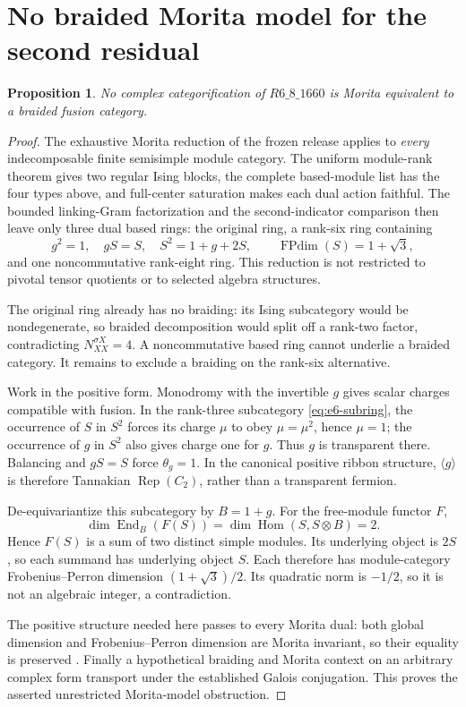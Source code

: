 \documentclass[10pt]{article}
\newtheorem{proposition}[theorem]{Proposition}
\newcommand{\FPdim}{\operatorname{FPdim}}
\begin{document}
\section{No braided Morita model for the second residual}
\begin{proposition}
No complex categorification of $R6\_8\_1660$ is Morita equivalent to a braided fusion category.
\end{proposition}
\begin{proof}
The exhaustive Morita reduction of the frozen release applies to \emph{every} indecomposable finite semisimple module category. The uniform module-rank theorem gives two regular Ising blocks, the complete based-module list has the four types above, and full-center saturation makes each dual action faithful. The bounded linking-Gram factorization and the second-indicator comparison then leave only three dual based rings: the original ring, a rank-six ring containing
\begin{equation}\label{eq:e6-subring}
 g^2=1,\quad gS=S,\quad S^2=1+g+2S,
 \qquad\FPdim(S)=1+\sqrt3,
\end{equation}
and one noncommutative rank-eight ring. This reduction is not restricted to pivotal tensor quotients or to selected algebra structures.

The original ring already has no braiding: its Ising subcategory would be nondegenerate, so braided decomposition would split off a rank-two factor, contradicting $N_{XX}^{\sigma X}=4$. A noncommutative based ring cannot underlie a braided category. It remains to exclude a braiding on the rank-six alternative.

Work in the positive form. Monodromy with the invertible $g$ gives scalar charges compatible with fusion. In the rank-three subcategory \eqref{eq:e6-subring}, the occurrence of $S$ in $S^2$ forces its charge $\mu$ to obey $\mu=\mu^2$, hence $\mu=1$; the occurrence of $g$ in $S^2$ also gives charge one for $g$. Thus $g$ is transparent there. Balancing and $gS=S$ force $\theta_g=1$. In the canonical positive ribbon structure, $\langle g\rangle$ is therefore Tannakian $\operatorname{Rep}(C_2)$, rather than a transparent fermion.

De-equivariantize this subcategory by $B=1+g$. For the free-module functor $F$,
\[
 \dim\operatorname{End}_{B}(F(S))
 =\dim\operatorname{Hom}(S,S\otimes B)=2.
\]
Hence $F(S)$ is a sum of two distinct simple modules. Its underlying object is $2S$, so each summand has underlying object $S$. Each therefore has module-category Frobenius--Perron dimension $(1+\sqrt3)/2$. Its quadratic norm is $-1/2$, so it is not an algebraic integer, a contradiction.

The positive structure needed here passes to every Morita dual: both global dimension and Frobenius--Perron dimension are Morita invariant, so their equality is preserved \cite[Theorem 2.15 and Corollary 8.14]{ENO}. Finally a hypothetical braiding and Morita context on an arbitrary complex form transport under the established Galois conjugation. This proves the asserted unrestricted Morita-model obstruction.
\end{proof}
\end{document}
